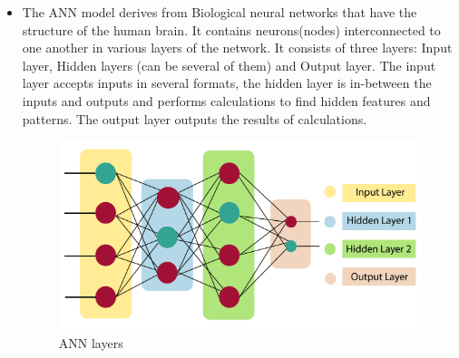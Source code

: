 \documentclass[
  letterpaper,
  DIV=11,
  numbers=noendperiod]{scrartcl}
\begin{document}
\begin{itemize}
\item
  The ANN model derives from Biological neural networks that have the
  structure of the human brain. It contains neurons(nodes)
  interconnected to one another in various layers of the network. It
  consists of three layers: Input layer, Hidden layers (can be several
  of them) and Output layer. The input layer accepts inputs in several
  formats, the hidden layer is in-between the inputs and outputs and
  performs calculations to find hidden features and patterns. The output
  layer outputs the results of calculations.

  \begin{figure}

  {\centering \includegraphics{ANNPicture.png}

  }

  \caption{ANN layers}

  \end{figure}
\end{itemize}

\hfill\break
\end{document}
